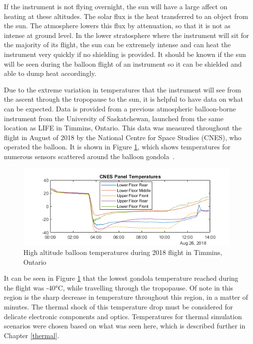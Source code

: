 If the instrument is not flying overnight, the sun will have a large affect on heating at these altitudes. The solar flux is the heat transferred to an object from the sun. The atmosphere lowers this flux by attenuation, so that it is not as intense at ground level. In the lower stratosphere where the instrument will sit for the majority of its flight, the sun can be extremely intense and can heat the instrument very quickly if no shielding is provided. It should be known if the sun will be seen during the balloon flight of an instrument so it can be shielded and able to dump heat accordingly.

Due to the extreme variation in temperatures that the instrument will see from the ascent through the tropopause to the sun, it is helpful to have data on what can be expected. Data is provided from a previous atmospheric balloon-borne instrument from the University of Saskatchewan, launched from the same location as LIFE in Timmins, Ontario. This data was measured throughout the flight in August of 2018 by the National Centre for Space Studies (CNES), who operated the balloon. It is shown in Figure \ref{fig:2018_timmins_temps}, which shows temperatures for numerous sensors scattered around the balloon gondola~\citep{CATS_report}.
 
 \begin{figure}
\centering
  \includegraphics{chap2_images/CNES_temps_CATS_2018.png}
  \caption{High altitude balloon temperatures during 2018 flight in Timmins, Ontario}
  \label{fig:2018_timmins_temps}
\end{figure}

It can be seen in Figure \ref{fig:2018_timmins_temps} that the lowest gondola temperature reached during the flight was -40°C, while travelling through the tropopause. Of note in this region is the sharp decrease in temperature throughout this region, in a matter of minutes. The thermal shock of this temperature drop must be considered for delicate electronic components and optics. Temperatures for thermal simulation scenarios were chosen based on what was seen here, which is described further in Chapter \ref{thermal}.

